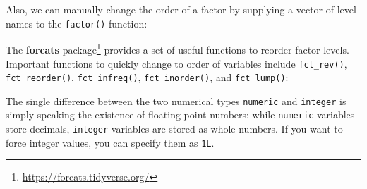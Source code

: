 \documentclass[
]{krantz}
\makeatletter
\newenvironment{Shaded}{\begin{snugshade}}{\end{snugshade}}
\newcommand{\AttributeTok}[1]{\textcolor[rgb]{0.27,0.27,0.27}{#1}}
\newcommand{\DocumentationTok}[1]{\textcolor[rgb]{0.37,0.37,0.37}{\textbf{\textit{#1}}}}
\newcommand{\FunctionTok}[1]{\textcolor[rgb]{0.27,0.27,0.27}{\textbf{#1}}}
\newcommand{\NormalTok}[1]{#1}
\newcommand{\OtherTok}[1]{\textcolor[rgb]{0.37,0.37,0.37}{#1}}
\newcommand{\SpecialCharTok}[1]{\textcolor[rgb]{0.43,0.43,0.43}{\textbf{#1}}}
\newcommand{\StringTok}[1]{\textcolor[rgb]{0.5,0.5,0.5}{#1}}
\renewcommand{\href}[2]{#2\footnote{\url{#1}}}
\newenvironment{kframe}{%
\medskip{}
\setlength{\fboxsep}{.8em}
 \def\at@end@of@kframe{}%
 \ifinner\ifhmode%
  \def\at@end@of@kframe{\end{minipage}}%
  \begin{minipage}{\columnwidth}%
 \fi\fi%
 \def\FrameCommand##1{\hskip\@totalleftmargin \hskip-\fboxsep
 \colorbox{shadecolor}{##1}\hskip-\fboxsep
     \hskip-\linewidth \hskip-\@totalleftmargin \hskip\columnwidth}%
 \MakeFramed {\advance\hsize-\width
   \@totalleftmargin\z@ \linewidth\hsize
   \@setminipage}}%
 {\par\unskip\endMakeFramed%
 \at@end@of@kframe}
\renewenvironment{Shaded}{\begin{kframe}}{\end{kframe}}
\makeatother
\begin{document}
Also, we can manually change the order of a factor by supplying a vector of level names to the \texttt{factor()} function:

\begin{Shaded}
\end{Shaded}

The \href{https://forcats.tidyverse.org/}{\textbf{forcats} package} \citep{forcats} provides a set of useful functions to reorder factor levels. Important functions to quickly change to order of variables include \texttt{fct\_rev()}, \texttt{fct\_reorder()}, \texttt{fct\_infreq()}, \texttt{fct\_inorder()}, and \texttt{fct\_lump()}:

\begin{Shaded}
\end{Shaded}

The single difference between the two numerical types \texttt{numeric} and \texttt{integer} is simply-speaking the existence of floating point numbers: while \texttt{numeric} variables store decimals, \texttt{integer} variables are stored as whole numbers. If you want to force integer values, you can specify them as \texttt{1L}.
\end{document}
